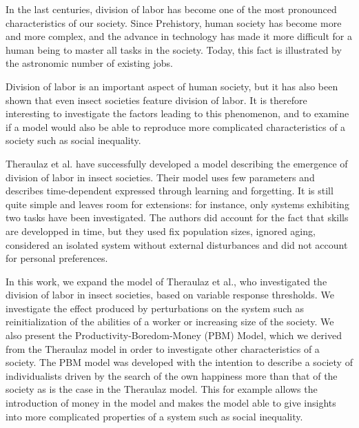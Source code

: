 In the last centuries, division of labor has become one of the most pronounced characteristics of our society. Since Prehistory, human society has become more and more complex, and the advance in technology has made it more difficult for a human being to master all tasks in the society. Today, this fact is illustrated by the astronomic number of existing jobs.

Division of labor is an important aspect of human society, but it has also been shown that even insect societies feature division of labor.%
It is therefore interesting to investigate the factors leading to this phenomenon, and to examine if a model would also be able to reproduce more complicated characteristics of a society such as social inequality. 

Theraulaz et al. have successfully developed a model describing the emergence of division of labor in insect societies.%
Their model uses few parameters and describes time-dependent expressed through learning and forgetting. It is still quite simple and leaves room for extensions: for instance, only systems exhibiting two tasks have been investigated. The authors did account for the fact that skills are developped in time, but they used fix population sizes, ignored aging, considered an isolated system without external disturbances and did not account for personal preferences. 

In this work, we expand the model of Theraulaz et al., who investigated the division of labor in insect societies, based on variable response thresholds. We investigate the effect produced by perturbations on the system such as reinitialization of the abilities of a worker or increasing size of the society.
We also present the Productivity-Boredom-Money (PBM) Model, which we derived from the Theraulaz model in order to investigate other characteristics of a society. The PBM model was developed with the intention to describe a society of individualists driven by the search of the own happiness more than that of the society as is the case in the Theraulaz model. This for example allows the introduction of money in the model and makes the model able to give insights into more complicated properties of a system such as social inequality.
